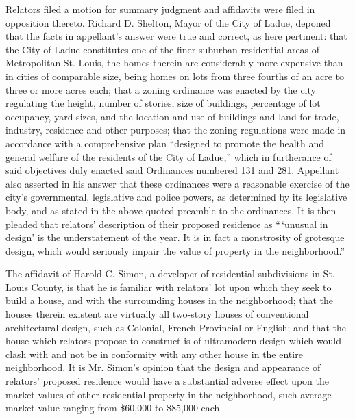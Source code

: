 Relators filed a motion for summary judgment and affidavits were filed in
opposition thereto. Richard D. Shelton, Mayor of the City of Ladue, deponed that
the facts in appellant's answer were true and correct, as here pertinent: that
the City of Ladue constitutes one of the finer suburban residential areas of
Metropolitan St. Louis, the homes therein are considerably more expensive than
in cities of comparable size, being homes on lots from three fourths of an acre
to three or more acres each; that a zoning ordinance was enacted by the city
regulating the height, number of stories, size of buildings, percentage of lot
occupancy, yard sizes, and the location and use of buildings and land for trade,
industry, residence and other purposes; that the zoning regulations were made in
accordance with a comprehensive plan ``designed to promote the health and
general welfare of the residents of the City of Ladue,'' which in furtherance of
said objectives duly enacted said Ordinances numbered 131 and 281. Appellant
also asserted in his answer that these ordinances were a reasonable exercise of
the city's governmental, legislative and police powers, as determined by its
legislative body, and as stated in the above-quoted preamble to the ordinances.
It is then pleaded that relators' description of their proposed residence as
``\,`unusual in design' is the understatement of the year. It is in fact a
monstrosity of grotesque design, which would seriously impair the value of
property in the neighborhood.''

The affidavit of Harold C. Simon, a developer of residential subdivisions in St.
Louis County, is that he is familiar with relators' lot upon which they seek to
build a house, and with the surrounding houses in the neighborhood; that the
houses therein existent are virtually all two-story houses of conventional
architectural design, such as Colonial, French Provincial or English; and that
the house which relators propose to construct is of ultramodern design which
would clash with and not be in conformity with any other house in the entire
neighborhood. It is Mr. Simon's opinion that the design and appearance of
relators' proposed residence would have a substantial adverse effect upon the
market values of other residential property in the neighborhood, such average
market value ranging from \$60,000 to \$85,000 each.

